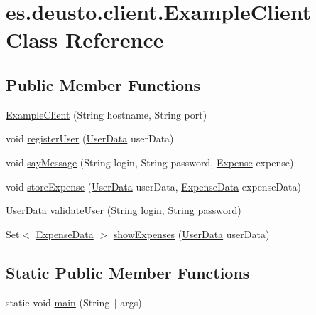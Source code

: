 \hypertarget{classes_1_1deusto_1_1client_1_1_example_client}{}\section{es.\+deusto.\+client.\+Example\+Client Class Reference}
\label{classes_1_1deusto_1_1client_1_1_example_client}
\subsection*{Public Member Functions}
\begin{DoxyCompactItemize}
\item 
\hyperlink{classes_1_1deusto_1_1client_1_1_example_client_afe4bf9d0ff661de1e0ba936df0ce807f}{Example\+Client} (String hostname, String port)
\item 
void \hyperlink{classes_1_1deusto_1_1client_1_1_example_client_a1c17371c17dde2b7664f2ad17ee79e4b}{register\+User} (\hyperlink{classes_1_1deusto_1_1serialization_1_1_user_data}{User\+Data} user\+Data)
\item 
void \hyperlink{classes_1_1deusto_1_1client_1_1_example_client_ae2e3b42bf8ef3a646d92e2b308e38005}{say\+Message} (String login, String password, \hyperlink{classes_1_1deusto_1_1server_1_1jdo_1_1_expense}{Expense} expense)
\item 
void \hyperlink{classes_1_1deusto_1_1client_1_1_example_client_aba5fe3dfb882ef22d0bd49b5915871d3}{store\+Expense} (\hyperlink{classes_1_1deusto_1_1serialization_1_1_user_data}{User\+Data} user\+Data, \hyperlink{classes_1_1deusto_1_1serialization_1_1_expense_data}{Expense\+Data} expense\+Data)
\item 
\hyperlink{classes_1_1deusto_1_1serialization_1_1_user_data}{User\+Data} \hyperlink{classes_1_1deusto_1_1client_1_1_example_client_a740fa7000d0cd30603ce100b299ba8ba}{validate\+User} (String login, String password)
\item 
Set$<$ \hyperlink{classes_1_1deusto_1_1serialization_1_1_expense_data}{Expense\+Data} $>$ \hyperlink{classes_1_1deusto_1_1client_1_1_example_client_a527d2790290c153cae5b16133a38269a}{show\+Expenses} (\hyperlink{classes_1_1deusto_1_1serialization_1_1_user_data}{User\+Data} user\+Data)
\end{DoxyCompactItemize}
\subsection*{Static Public Member Functions}
\begin{DoxyCompactItemize}
\item 
static void \hyperlink{classes_1_1deusto_1_1client_1_1_example_client_a9eadbc017db92b83cad1f6b72c10bae2}{main} (String\mbox{[}$\,$\mbox{]} args)
\end{DoxyCompactItemize}


